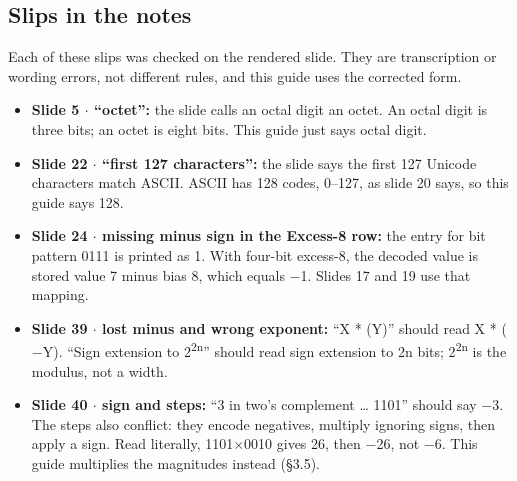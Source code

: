 \documentclass[11pt]{article}
\begin{document}
\begin{keepsection}
\section{Slips in the notes}

Each of these slips was checked on the rendered slide. They are transcription or wording errors, not different rules, and this guide uses the corrected form.

\begin{itemize}
\item \textbf{Slide 5 \ensuremath{\cdot} “octet”:} the slide calls an octal digit an octet. An octal digit is three bits; an octet is eight bits. This guide just says octal digit.
\item \textbf{Slide 22 \ensuremath{\cdot} “first 127 characters”:} the slide says the first 127 Unicode characters match ASCII. ASCII has 128 codes, 0–127, as slide 20 says, so this guide says 128.
\item \textbf{Slide 24 \ensuremath{\cdot} missing minus sign in the Excess-8 row:} the entry for bit pattern 0111 is printed as 1. With four-bit excess-8, the decoded value is stored value 7 minus bias 8, which equals \ensuremath{-}1. Slides 17 and 19 use that mapping.
\item \textbf{Slide 39 \ensuremath{\cdot} lost minus and wrong exponent:} “X * (Y)” should read X * (\ensuremath{-}Y). “Sign extension to 2\textsuperscript{2n}” should read sign extension to 2n bits; 2\textsuperscript{2n} is the modulus, not a width.
\item \textbf{Slide 40 \ensuremath{\cdot} sign and steps:} “3 in two’s complement … 1101” should say \ensuremath{-}3. The steps also conflict: they encode negatives, multiply ignoring signs, then apply a sign. Read literally, 1101\ensuremath{\times}0010 gives 26, then \ensuremath{-}26, not \ensuremath{-}6. This guide multiplies the magnitudes instead (§3.5).
\end{itemize}
\end{keepsection}
\end{document}
